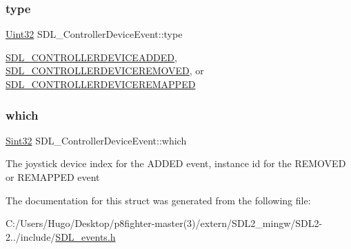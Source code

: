 \subsubsection{\texorpdfstring{type}{type}}
{\footnotesize\ttfamily \hyperlink{_s_d_l__stdinc_8h_add440eff171ea5f55cb00c4a9ab8672d}{Uint32} S\+D\+L\+\_\+\+Controller\+Device\+Event\+::type}

\hyperlink{_s_d_l__events_8h_a3b589e89be6b35c02e0dd34a55f3fccaa9642de478348da1aba4fb5791e8c5314}{S\+D\+L\+\_\+\+C\+O\+N\+T\+R\+O\+L\+L\+E\+R\+D\+E\+V\+I\+C\+E\+A\+D\+D\+ED}, \hyperlink{_s_d_l__events_8h_a3b589e89be6b35c02e0dd34a55f3fccaae00ac6995dfb7b92bfae68b9f47ae07a}{S\+D\+L\+\_\+\+C\+O\+N\+T\+R\+O\+L\+L\+E\+R\+D\+E\+V\+I\+C\+E\+R\+E\+M\+O\+V\+ED}, or \hyperlink{_s_d_l__events_8h_a3b589e89be6b35c02e0dd34a55f3fccaaeca87c7b5bb21915d444298449a78ee6}{S\+D\+L\+\_\+\+C\+O\+N\+T\+R\+O\+L\+L\+E\+R\+D\+E\+V\+I\+C\+E\+R\+E\+M\+A\+P\+P\+ED} \mbox{\label{struct_s_d_l___controller_device_event_accb80de1619c1e790cffb6c888c915db}} 
\subsubsection{\texorpdfstring{which}{which}}
{\footnotesize\ttfamily \hyperlink{_s_d_l__stdinc_8h_a7a90b941db9d4582e9ad7abb9940ff7e}{Sint32} S\+D\+L\+\_\+\+Controller\+Device\+Event\+::which}

The joystick device index for the A\+D\+D\+ED event, instance id for the R\+E\+M\+O\+V\+ED or R\+E\+M\+A\+P\+P\+ED event 

The documentation for this struct was generated from the following file\+:\begin{DoxyCompactItemize}
\item 
C\+:/\+Users/\+Hugo/\+Desktop/p8fighter-\/master(3)/extern/\+S\+D\+L2\+\_\+mingw/\+S\+D\+L2-\/2../include/\hyperlink{_s_d_l__events_8h}{S\+D\+L\+\_\+events.\+h}\end{DoxyCompactItemize}
